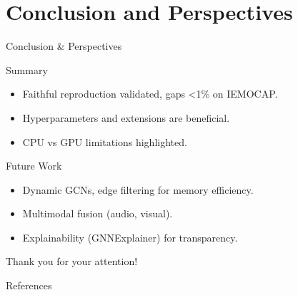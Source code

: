 \documentclass[10pt,aspectratio=169]{beamer}
\begin{document}
\section{Conclusion and Perspectives}
\begin{frame}{Conclusion \& Perspectives}
  \begin{block}{Summary}
    \begin{itemize}
      \item Faithful reproduction validated, gaps <1\% on IEMOCAP.
      \item Hyperparameters and extensions are beneficial.
      \item CPU vs GPU limitations highlighted.
    \end{itemize}
  \end{block}
  \vspace{0.5em}
  \begin{block}{Future Work}
    \begin{itemize}
      \item Dynamic GCNs, edge filtering for memory efficiency.
      \item Multimodal fusion (audio, visual).
      \item Explainability (GNNExplainer) for transparency.
    \end{itemize}
  \end{block}
  \vfill
  \begin{center}
    \Large\color{primary} Thank you for your attention!
  \end{center}
\end{frame}

\begin{frame}[allowframebreaks]{References}
    \printbibliography[heading=none]
\end{frame}
\end{document}
